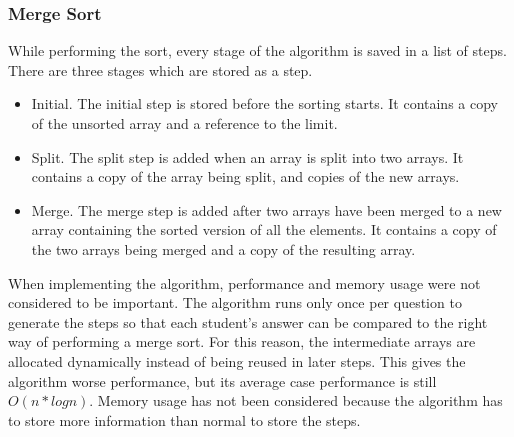 \subsubsection{Merge Sort}
While performing the sort, every stage of the algorithm is saved in a list of steps. There are three stages which are stored as a step.
\begin{itemize}
    \item Initial. The initial step is stored before the sorting starts. It contains a copy of the unsorted array and a reference to the limit.
    \item Split. The split step is added when an array is split into two arrays. It contains a copy of the array being split, and copies of the new arrays.
    \item Merge. The merge step is added after two arrays have been merged to a new array containing the sorted version of all the elements. It contains a copy of the two arrays being merged and a copy of the resulting array.
\end{itemize}
When implementing the algorithm, performance and memory usage were not considered to be important. The algorithm runs only once per question to generate the steps so that each student's answer can be compared to the right way of performing a merge sort. For this reason, the intermediate arrays are allocated dynamically instead of being reused in later steps. This gives the algorithm worse performance, but its average case performance is still $O(n * logn)$. Memory usage has not been considered because the algorithm has to store more information than normal to store the steps.